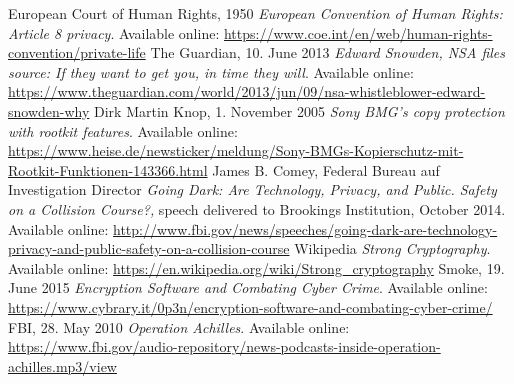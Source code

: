 \documentclass[a4paper, 11pt]{article}
\begin{document}
\begin{thebibliography}{9}
     European Court of Human Rights, 1950 \emph{European Convention of Human Rights: Article 8  privacy}. Available online: \href{https://www.coe.int/en/web/human-rights-convention/private-life}{https://www.coe.int/en/web/human-rights-convention/private-life}
     The Guardian, 10. June 2013 \emph{Edward Snowden, NSA files source: If they want to get you, in time they will}. Available online: \href{https://www.theguardian.com/world/2013/jun/09/nsa-whistleblower-edward-snowden-why}{https://www.theguardian.com/world/2013/jun/09/nsa-whistleblower-edward-snowden-why}
     Dirk Martin Knop, 1. November 2005 \emph{Sony BMG's copy protection with rootkit features}. Available online: \href{https://www.heise.de/newsticker/meldung/Sony-BMGs-Kopierschutz-mit-Rootkit-Funktionen-143366.html}{https://www.heise.de/newsticker/meldung/Sony-BMGs-Kopierschutz-mit-Rootkit-Funktionen-143366.html}
     James B. Comey, Federal Bureau auf Investigation Director \emph{Going Dark: Are Technology, Privacy, and Public. Safety on a Collision Course?,} speech delivered to Brookings Institution, October 2014. Available online: \href{http://www.fbi.gov/news/speeches/going-dark-are-technology-privacy-and-public-safety-on-a-collision-course}{http://www.fbi.gov/news/speeches/going-dark-are-technology-privacy-and-public-safety-on-a-collision-course}
     Wikipedia \emph{Strong Cryptography}. Available online: \href{https://en.wikipedia.org/wiki/Strong\_cryptography}{https://en.wikipedia.org/wiki/Strong\_cryptography}
     Smoke, 19. June 2015 \emph{Encryption Software and Combating Cyber Crime}. Available online: \href{https://www.cybrary.it/0p3n/encryption-software-and-combating-cyber-crime/}{https://www.cybrary.it/0p3n/encryption-software-and-combating-cyber-crime/}
     FBI, 28. May 2010 \emph{Operation Achilles}. Available online: \href{https://www.fbi.gov/audio-repository/news-podcasts-inside-operation-achilles.mp3/view}{https://www.fbi.gov/audio-repository/news-podcasts-inside-operation-achilles.mp3/view}
\end{thebibliography}
\end{document}

